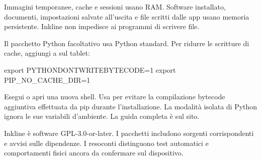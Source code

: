 Immagini temporanee, cache e sessioni usano RAM. Software installato, documenti,
impostazioni salvate all'uscita e file scritti dalle app usano memoria persistente.
Inkline non impedisce ai programmi di scrivere file.

Il pacchetto Python facoltativo usa Python standard. Per ridurre le scritture
di cache, aggiungi a  sul tablet:
\begin{shell}
export PYTHONDONTWRITEBYTECODE=1
export PIP_NO_CACHE_DIR=1
\end{shell}
Esegui  o apri una nuova shell. Usa
 per evitare la compilazione
bytecode aggiuntiva effettuata da pip durante l'installazione. La modalità
isolata di Python ignora le sue variabili d'ambiente. La guida completa è sul sito.

Inkline è software GPL-3.0-or-later. I pacchetti includono sorgenti corrispondenti
e avvisi sulle dipendenze. I resoconti distinguono test automatici e comportamenti
fisici ancora da confermare sul dispositivo.
